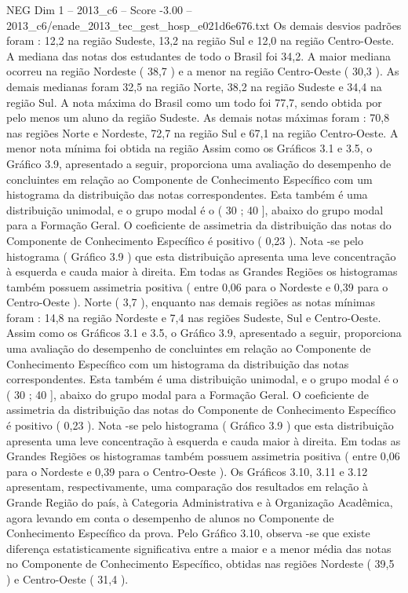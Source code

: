 \begin{textsample}{NEG Dim 1 – 2013\_c6 – Score -3.00 – 2013\_c6/enade\_2013\_tec\_gest\_hosp\_e021d6e676.txt}
Os demais desvios padrões foram : 12,2 na região Sudeste, 13,2 na região Sul e 12,0 na região Centro-Oeste.
A mediana das notas dos estudantes de todo o Brasil foi 34,2.
A maior mediana ocorreu na região Nordeste ( 38,7 ) e a menor na região Centro-Oeste ( 30,3 ).
As demais medianas foram 32,5 na região Norte, 38,2 na região Sudeste e 34,4 na região Sul.
A nota máxima do Brasil como um todo foi 77,7, sendo obtida por pelo menos um aluno da região Sudeste.
As demais notas máximas foram : 70,8 nas regiões Norte e Nordeste, 72,7 na região Sul e 67,1 na região Centro-Oeste.
A menor nota mínima foi obtida na região Assim como os Gráficos 3.1 e 3.5, o Gráfico 3.9, apresentado a seguir, proporciona uma avaliação do desempenho de concluintes em relação ao Componente de Conhecimento Específico com um histograma da distribuição das notas correspondentes.
Esta também é uma distribuição unimodal, e o grupo modal é o ( 30 ; 40 ], abaixo do grupo modal para a Formação Geral.
O coeficiente de assimetria da distribuição das notas do Componente de Conhecimento Específico é positivo ( 0,23 ).
Nota -se pelo histograma ( Gráfico 3.9 ) que esta distribuição apresenta uma leve concentração à esquerda e cauda maior à direita.
Em todas as Grandes Regiões os histogramas também possuem assimetria positiva ( entre 0,06 para o Nordeste e 0,39 para o Centro-Oeste ).
Norte ( 3,7 ), enquanto nas demais regiões as notas mínimas foram : 14,8 na região Nordeste e 7,4 nas regiões Sudeste, Sul e Centro-Oeste.
Assim como os Gráficos 3.1 e 3.5, o Gráfico 3.9, apresentado a seguir, proporciona uma avaliação do desempenho de concluintes em relação ao Componente de Conhecimento Específico com um histograma da distribuição das notas correspondentes.
Esta também é uma distribuição unimodal, e o grupo modal é o ( 30 ; 40 ], abaixo do grupo modal para a Formação Geral.
O coeficiente de assimetria da distribuição das notas do Componente de Conhecimento Específico é positivo ( 0,23 ).
Nota -se pelo histograma ( Gráfico 3.9 ) que esta distribuição apresenta uma leve concentração à esquerda e cauda maior à direita.
Em todas as Grandes Regiões os histogramas também possuem assimetria positiva ( entre 0,06 para o Nordeste e 0,39 para o Centro-Oeste ).
Os Gráficos 3.10, 3.11 e 3.12 apresentam, respectivamente, uma comparação dos resultados em relação à Grande Região do país, à Categoria Administrativa e à Organização Acadêmica, agora levando em conta o desempenho de alunos no Componente de Conhecimento Específico da prova.
Pelo Gráfico 3.10, observa -se que existe diferença estatisticamente significativa entre a maior e a menor média das notas no Componente de Conhecimento Específico, obtidas nas regiões Nordeste ( 39,5 ) e Centro-Oeste ( 31,4 ).

\end{textsample}
